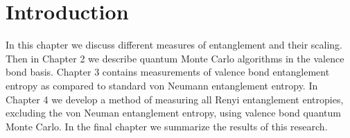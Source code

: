\chapter{Introduction}



In this chapter we discuss different measures of entanglement and their scaling.
Then in Chapter 2 we describe quantum Monte Carlo algorithms in the valence bond basis.
Chapter 3 contains measurements of valence bond entanglement entropy as compared to standard von Neumann entanglement entropy.
In Chapter 4 we develop a method of measuring all Renyi entanglement entropies, excluding the von Neuman entanglement entropy, using valence bond quantum Monte Carlo.
In the final chapter we summarize the results of this research.

